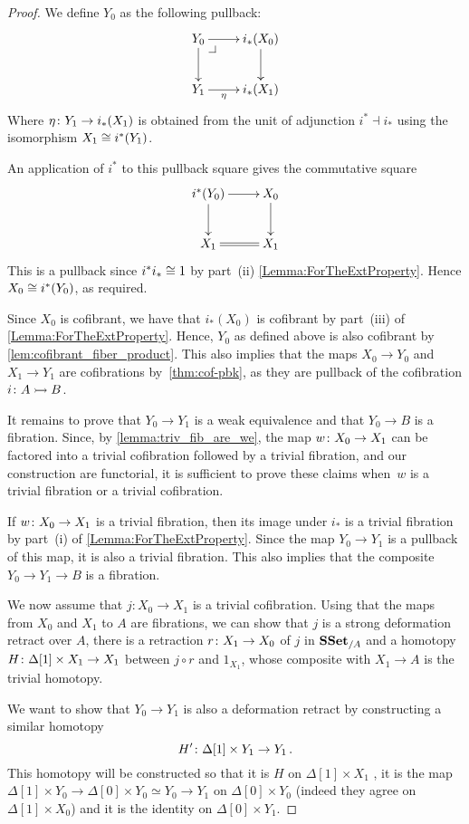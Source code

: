 \documentclass[reqno,10pt,a4paper,oneside,draft]{amsart}
\begin{document}
\begin{proof} We define $Y_0$ as the following pullback:
\[\xymatrix{
Y_0 \ar[d] \ar[r] \drpullback & i_*(X_0) \ar[d] \\
Y_1 \ar[r]_-{\eta} & i_*(X_1)
}\]
Where $\eta \colon Y_1 \rightarrow i_*(X_1)$ is obtained from the unit of adjunction  $i^* \dashv i_*$ using the isomorphism $X_1 \cong i^*(Y_1)$.

An application of $i^*$ to this pullback square gives the commutative square
\[\xymatrix{
i^*(Y_0) \ar[d] \ar[r]  & X_0 \ar[d] \\
X_1 \ar@{=}[r] & X_1
}\]
This is a pullback since $i^* i_* \cong 1$ by part~(ii) \cref{Lemma:ForTheExtProperty}. Hence $X_0 \cong i^*(Y_0)$, as required.


Since $X_0$ is cofibrant, we have that $i_*(X_0)$ is cofibrant by part~(iii) of  \cref{Lemma:ForTheExtProperty}. Hence, $Y_0$ as defined above is also cofibrant by \cref{lem:cofibrant_fiber_product}. This also implies that the maps $X_0 \rightarrow Y_0$ and $X_1 \rightarrow Y_1$ are cofibrations by~\cref{thm:cof-pbk}, as they are pullback of the cofibration 
$i \colon A \rightarrowtail B$.





It remains to prove that $Y_0 \rightarrow Y_1$ is a weak equivalence and that $Y_0 \rightarrow B$ is a fibration. Since, by \cref{lemma:triv_fib_are_we}, the map $w \colon X_0 \rightarrow X_1$ can be factored into a trivial cofibration followed by a trivial fibration, and our construction are functorial, it is sufficient to prove these claims when~$w$ is a trivial fibration or a trivial cofibration.

If $w \colon X_0 \rightarrow X_1$ is a trivial fibration, then its image under $i_*$ is a trivial fibration by 
part~(i) of \cref{Lemma:ForTheExtProperty}. Since the map $Y_0 \rightarrow Y_1$ is a pullback of this map,
it is also a trivial fibration. This also implies that the composite $Y_0 \rightarrow Y_1 \rightarrow B$ is a fibration.


We now assume that $j:X_0 \rightarrow X_1$ is a trivial cofibration. Using that the maps from $X_0$ and $X_1$ to $A$ are fibrations, we can show that $j$ is a strong deformation retract over $A$, \ie there is a retraction $r \colon X_1 \rightarrow X_0$ of $j$ in $\mathbf{SSet}_{/A}$ and a homotopy $H \colon \Delta[1] \times X_1 \rightarrow X_1$ between $j \circ r$ and $1_{X_1}$, whose composite with $X_1 \rightarrow A$ is the trivial homotopy.

We want to show that $Y_0 \rightarrow Y_1$ is also a deformation retract by constructing a similar homotopy \[
H' \colon \Delta[1] \times Y_1 \rightarrow Y_1 \, .
\] 
This homotopy will be constructed so that it is $H$ on $\Delta[1] \times X_1$ ,  it is the map $\Delta[1] \times Y_0 \rightarrow \Delta[0] \times Y_0 \simeq Y_0 \rightarrow Y_1$ on $\Delta[0] \times Y_0 $ (indeed they agree on $\Delta[1] \times X_0$) and it is the identity on $\Delta[0] \times Y_1$. 


\end{proof}
\end{document}
